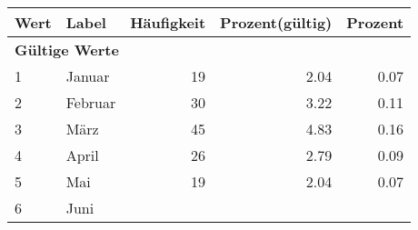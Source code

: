      \begin{longtable}{lXrrr}
     \toprule
     \textbf{Wert} & \textbf{Label} & \textbf{Häufigkeit} & \textbf{Prozent(gültig)} & \textbf{Prozent} \\
     \endhead
     \midrule
     \multicolumn{5}{l}{\textbf{Gültige Werte}}\\

     1 &
     \multicolumn{1}{X}{ Januar   } &


       \num{19} &
       \num[round-mode=places,round-precision=2]{2,04} &
         \num[round-mode=places,round-precision=2]{0,07} \\

     2 &
     \multicolumn{1}{X}{ Februar   } &


       \num{30} &
       \num[round-mode=places,round-precision=2]{3,22} &
         \num[round-mode=places,round-precision=2]{0,11} \\

     3 &
     \multicolumn{1}{X}{ März   } &


       \num{45} &
       \num[round-mode=places,round-precision=2]{4,83} &
         \num[round-mode=places,round-precision=2]{0,16} \\

     4 &
     \multicolumn{1}{X}{ April   } &


       \num{26} &
       \num[round-mode=places,round-precision=2]{2,79} &
         \num[round-mode=places,round-precision=2]{0,09} \\

     5 &
     \multicolumn{1}{X}{ Mai   } &


       \num{19} &
       \num[round-mode=places,round-precision=2]{2,04} &
         \num[round-mode=places,round-precision=2]{0,07} \\

     6 &
     \multicolumn{1}{X}{ Juni   } &



\end{longtable}

